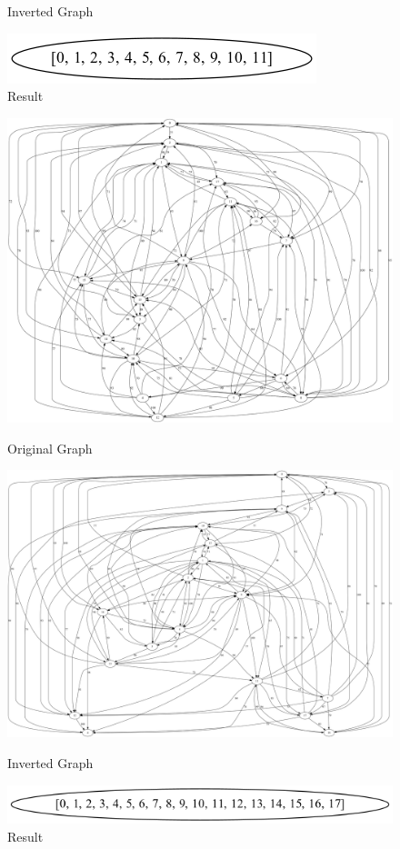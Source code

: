 \documentclass{article}
\begin{document}
\begin{figure}[!htb]
  \caption{Inverted Graph}
\endminipage\hfill
{}
  \includegraphics[width=\linewidth]{"./output/scc_example12_result.png"}
  \caption{Result}
\endminipage
\end{figure}

\begin{figure}[!htb]
  \includegraphics[width=\linewidth]{"./output/scc_example18.png"}
  \caption{Original Graph}
\endminipage\hfill
{}
  \includegraphics[width=\linewidth]{"./output/scc_example18_inv.png"}
  \caption{Inverted Graph}
\endminipage\hfill
{}
  \includegraphics[width=\linewidth]{"./output/scc_example18_result.png"}
  \caption{Result}
\endminipage
\end{figure}
\end{document}
